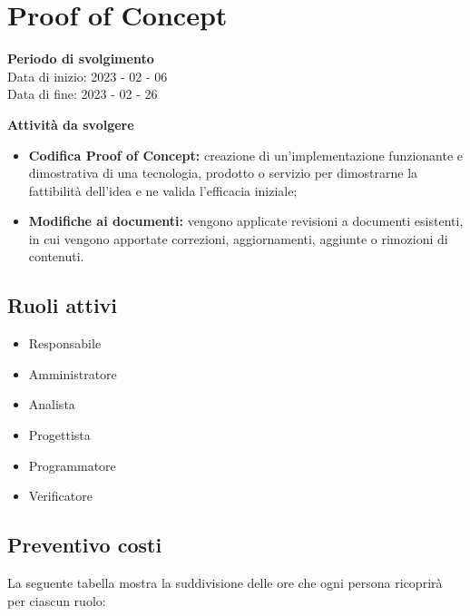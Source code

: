 \section{Proof of Concept}

\textbf{Periodo di svolgimento}
\\ Data di inizio: 2023 - 02 - 06 \\ Data di fine: 2023 - 02 - 26

\textbf{Attività da svolgere}
    \begin{itemize}
        \item \textbf{Codifica Proof of Concept:} creazione di un'implementazione funzionante e dimostrativa di una tecnologia, prodotto o servizio per dimostrarne la fattibilità dell'idea e ne valida l'efficacia iniziale; 
        \item \textbf{Modifiche ai documenti:} vengono applicate revisioni a documenti esistenti, in cui vengono apportate correzioni, aggiornamenti, aggiunte o rimozioni di contenuti.
    \end{itemize}

\subsection{Ruoli attivi}
\begin{itemize}
    \item Responsabile 
    \item Amministratore 
    \item Analista 
    \item Progettista 
    \item Programmatore 
    \item Verificatore 
\end{itemize}

\subsection{Preventivo costi}

La seguente tabella mostra la suddivisione delle ore che ogni persona ricoprirà per ciascun ruolo:

